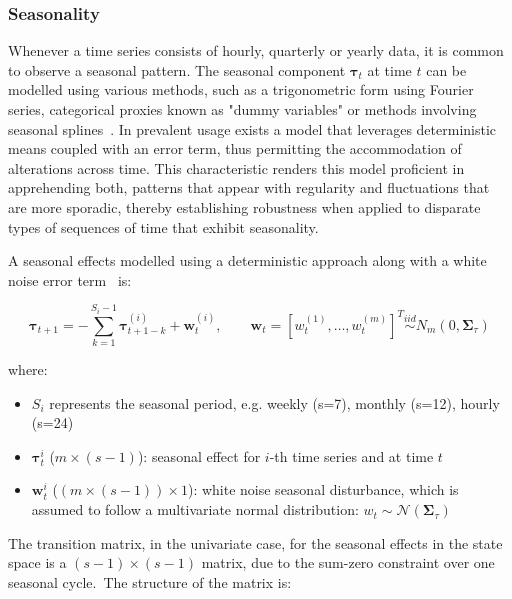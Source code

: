 \subsubsection{Seasonality}
    \label{sec:seasonality_component}

    Whenever a time series consists of hourly, quarterly or yearly data, it is common to observe a seasonal pattern.
    The seasonal component $\bm{\tau}_{t}$ at time $t$ can be modelled using various methods,
    such as a trigonometric form using Fourier series, categorical proxies known as "dummy variables"
    or methods involving seasonal splines~\cite{proietti_seasonality_2023}.
    In prevalent usage exists a model that leverages deterministic means coupled with an error term,
    thus permitting the accommodation of alterations across time.
    This characteristic renders this model proficient in apprehending both,
    patterns that appear with regularity and fluctuations that are more sporadic,
    thereby establishing robustness when applied to disparate types of sequences of time that exhibit seasonality.

    A seasonal effects modelled using a deterministic approach along with a white noise error term~\cite{qiu_multivariate_2018} is:

    \begin{equation}
        \bm{\tau}_{t+1} = - \sum_{k=1}^{S_{i}-1} \bm{\tau}_{t+1-k}^{(i)} + \bm{w}_{t}^{(i)},
            \qquad \bm{w}_{t} = [w_{t}^{(1)}, \ldots, w_{t}^{(m)}]^{T}
            \stackrel{\textit{iid}}{\sim} N_{m}(0, \bm{\Sigma}_{\tau})
        \label{eq:seasonal}
    \end{equation}

    where:
    \begin{itemize}
        \item $S_{i}$ represents the seasonal period, e.g. weekly (s=7), monthly (s=12), hourly (s=24)
        \item $\bm{\tau}_{t}^{i}$ ($m \times (s-1)$): seasonal effect for $i$-th time series and at time $t$
        \item $\bm{w}_{t}^{i}$ ($(m \times (s-1)) \times 1$): white noise seasonal disturbance,
            which is assumed to follow a multivariate normal distribution: $w_{t} \sim \mathcal{N}(\bm{\Sigma}_{\tau})$
    \end{itemize}

    The transition matrix, in the univariate case, for the seasonal effects in the state space is a $(s-1) \times (s-1)$ matrix,
    due to the sum-zero constraint over one seasonal cycle.\ The structure of the matrix is:

